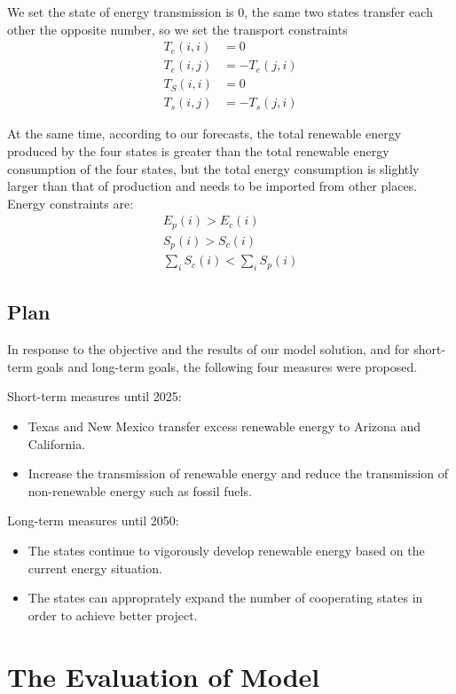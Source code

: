 \documentclass{mcmthesis}
\begin{document}
We set the state of energy transmission is 0, the same two states transfer each other the opposite number, so we set the transport constraints
\begin{align}
  T_e(i,i) &= 0 \\
  T_e(i,j) &= -T_e(j,i) \\
  T_S(i,i) &= 0 \\
  T_s(i,j) &= -T_s(j,i)
\end{align}

At the same time, according to our forecasts, the total renewable energy produced by the four states is greater than the total renewable energy consumption of the four states, but the total energy consumption is slightly larger than that of production and needs to be imported from other places. Energy constraints are:
\begin{align}
  E_p(i) > E_c(i) \\
  S_p(i) > S_c(i) \\
  \sum\limits_{i}S_c(i) < \sum\limits_{i}S_p(i) 
\end{align}
\subsection{Plan}

In response to the objective and the results of our model solution, and for short-term goals and long-term goals, the following four measures were proposed.

Short-term measures until 2025:
\begin{itemize}
  \item Texas and New Mexico transfer excess renewable energy to Arizona and California.
  \item Increase the transmission of renewable energy and reduce the transmission of non-renewable energy such as fossil fuels.
\end{itemize}
Long-term measures until 2050:
\begin{itemize}
  \item The states continue to vigorously develop renewable energy based on the current energy situation.
  \item The states can approprately expand the number of cooperating states in order to achieve better project. 
\end{itemize}

\section{The Evaluation of Model}
\end{document}
